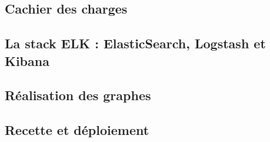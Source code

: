 \subsection{Cachier des charges}
	

\subsection{La stack ELK : ElasticSearch, Logstash et Kibana}
	
	
\subsection{Réalisation des graphes}
	
	
\subsection{Recette et déploiement}
	